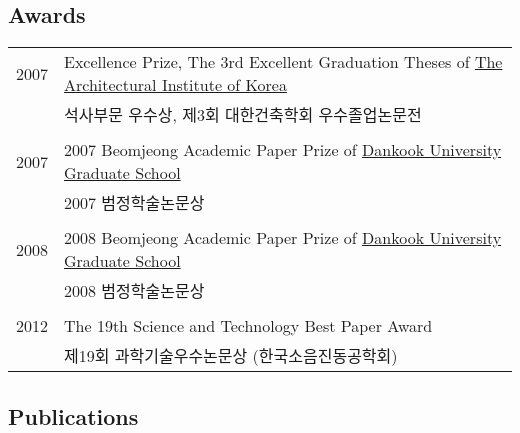 \subsection*{Awards}

\begin{tabularx}{\textwidth}{p{}X}
    2007 & Excellence Prize, The 3rd Excellent Graduation Theses of \href{http://www.aik.or.kr}{The Architectural Institute of Korea} \\
    & 석사부문 우수상, 제3회 대한건축학회 우수졸업논문전 \\
    \\
    2007 & 2007 Beomjeong Academic Paper Prize of \href{http://cms.dankook.ac.kr/web/grad}{Dankook University Graduate School} \\
    & 2007 범정학술논문상 \\
    \\
    2008 & 2008 Beomjeong Academic Paper Prize of \href{http://cms.dankook.ac.kr/web/grad}{Dankook University Graduate School} \\
    & 2008 범정학술논문상 \\
    \\
    2012 & The 19th Science and Technology Best Paper Award \\
    & 제19회 과학기술우수논문상 (한국소음진동공학회)
    \\
\end{tabularx}

\subsection*{Publications}
